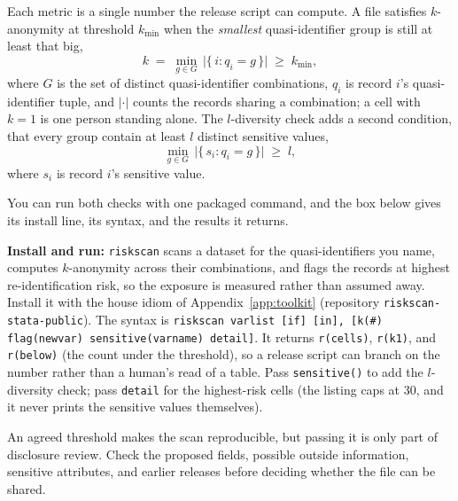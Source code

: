 \documentclass[
    a4paper,
    fontsize=10pt,
    twoside=true,
    numbers=noenddot,
]{kaobook}
\begin{document}
Each metric is a single number the release script can compute. A file satisfies $k$-anonymity at threshold $k_{\min}$ when the \emph{smallest} quasi-identifier group is still at least that big,
\[
  k \;=\; \min_{g \in G}\, \bigl|\{\, i : q_i = g \,\}\bigr| \;\ge\; k_{\min},
\]
where $G$ is the set of distinct quasi-identifier combinations, $q_i$ is record $i$'s quasi-identifier tuple, and $\lvert\cdot\rvert$ counts the records sharing a combination; a cell with $k=1$ is one person standing alone. The $l$-diversity check adds a second condition, that every group contain at least $l$ distinct sensitive values,
\[
  \min_{g \in G}\, \bigl|\{\, s_i : q_i = g \,\}\bigr| \;\ge\; l,
\]
where $s_i$ is record $i$'s sensitive value.

You can run both checks with one packaged command, and the box below gives its install line, its syntax, and the results it returns.

\begin{kaobox}[frametitle=Package Integration: \texttt{riskscan}]
\textbf{Install and run:} \texttt{riskscan} scans a dataset for the quasi-identifiers you name, computes $k$-anonymity across their combinations, and flags the records at highest re-identification risk, so the exposure is measured rather than assumed away. Install it with the house idiom of Appendix~\ref{app:toolkit} (repository \texttt{riskscan-stata-public}).
The syntax is \texttt{riskscan varlist [if] [in], [k(\#) flag(newvar) sensitive(varname) detail]}. It returns \texttt{r(cells)}, \texttt{r(k1)}, and \texttt{r(below)} (the count under the threshold), so a release script can branch on the number rather than a human's read of a table. Pass \texttt{sensitive()} to add the $l$-diversity check; pass \texttt{detail} for the highest-risk cells (the listing caps at 30, and it never prints the sensitive values themselves).
\end{kaobox}

An agreed threshold makes the scan reproducible, but passing it is only part of disclosure review. Check the proposed fields, possible outside information, sensitive attributes, and earlier releases before deciding whether the file can be shared. 
\end{document}
